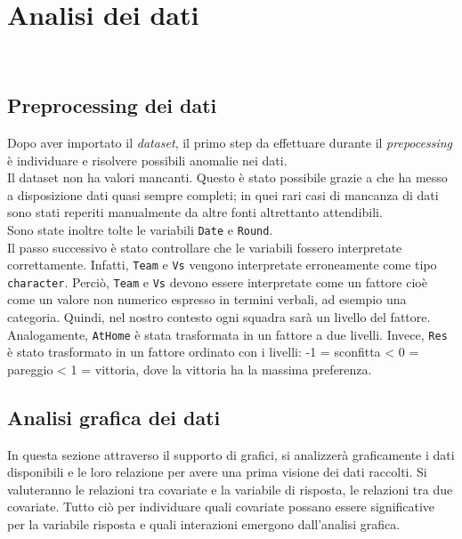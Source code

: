 
\chapter{Analisi dei dati}
\label{cap:Analisi}
\\


\section{Preprocessing dei dati}
Dopo aver importato il \emph{dataset}, il primo step da effettuare durante il \emph{prepocessing} è individuare e risolvere possibili anomalie nei dati.\\
Il dataset non ha valori mancanti. Questo è stato possibile grazie a \texttt{\cite{fbref}} che ha messo a disposizione dati quasi sempre completi; in quei rari casi di mancanza di dati sono stati reperiti manualmente da altre fonti altrettanto attendibili.\\ 
Sono state inoltre tolte le variabili \texttt{Date} e \texttt{Round}.\\
Il passo successivo è stato controllare che le variabili fossero interpretate correttamente. Infatti, \texttt{Team} e \texttt{Vs} vengono interpretate erroneamente come tipo \texttt{character}. Perciò, \texttt{Team} e \texttt{Vs} devono essere interpretate come un fattore cioè come un valore non numerico espresso in termini verbali, ad esempio una categoria. Quindi, nel nostro contesto ogni squadra sarà un livello del fattore. Analogamente, \texttt{AtHome} è stata trasformata in un fattore a due livelli. Invece, \texttt{Res} è stato trasformato in un fattore ordinato con i livelli: -1 = sconfitta <  0 = pareggio < 1 = vittoria, dove la vittoria ha la massima preferenza.


\section{Analisi grafica dei dati}
In questa sezione attraverso il supporto di grafici, si analizzerà graficamente i dati disponibili e le loro relazione per avere una prima visione dei dati raccolti. Si valuteranno le relazioni tra covariate e la variabile di risposta, le relazioni tra due covariate. Tutto ciò per individuare quali covariate possano essere significative per la variabile risposta e quali interazioni emergono dall'analisi grafica.\\

